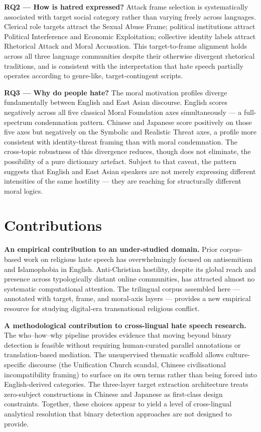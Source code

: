\documentclass[../CLthesis.tex]{subfiles}
\begin{document}
\textbf{RQ2 --- How is hatred expressed?} Attack frame selection is systematically associated with target social category rather than varying freely across languages. Clerical role targets attract the Sexual Abuse Frame; political institutions attract Political Interference and Economic Exploitation; collective identity labels attract Rhetorical Attack and Moral Accusation. This target-to-frame alignment holds across all three language communities despite their otherwise divergent rhetorical traditions, and is consistent with the interpretation that hate speech partially operates according to genre-like, target-contingent scripts.

\textbf{RQ3 --- Why do people hate?} The moral motivation profiles diverge fundamentally between English and East Asian discourse. English scores negatively across all five classical Moral Foundation axes simultaneously --- a full-spectrum condemnation pattern. Chinese and Japanese score positively on those five axes but negatively on the Symbolic and Realistic Threat axes, a profile more consistent with identity-threat framing than with moral condemnation. The cross-topic robustness of this divergence reduces, though does not eliminate, the possibility of a pure dictionary artefact. Subject to that caveat, the pattern suggests that English and East Asian speakers are not merely expressing different intensities of the same hostility --- they are reaching for structurally different moral logics.

\section{Contributions}
\label{sec:conclusion-contributions}

\textbf{An empirical contribution to an under-studied domain.} Prior corpus-based work on religious hate speech has overwhelmingly focused on antisemitism and Islamophobia in English. Anti-Christian hostility, despite its global reach and presence across typologically distant online communities, has attracted almost no systematic computational attention. The trilingual corpus assembled here --- annotated with target, frame, and moral-axis layers --- provides a new empirical resource for studying digital-era transnational religious conflict.

\textbf{A methodological contribution to cross-lingual hate speech research.} The who--how--why pipeline provides evidence that moving beyond binary detection is feasible without requiring human-curated parallel annotations or translation-based mediation. The unsupervised thematic scaffold allows culture-specific discourse (the Unification Church scandal, Chinese civilisational incompatibility framing) to surface on its own terms rather than being forced into English-derived categories. The three-layer target extraction architecture treats zero-subject constructions in Chinese and Japanese as first-class design constraints. Together, these choices appear to yield a level of cross-lingual analytical resolution that binary detection approaches are not designed to provide.
\end{document}
